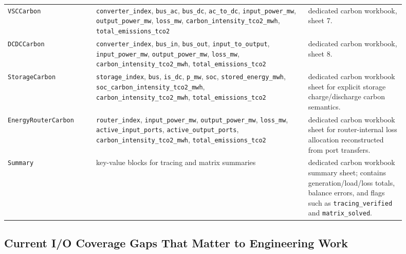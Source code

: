 \begin{longtable}{L{0.20\linewidth}L{0.48\linewidth}L{0.22\linewidth}}
\texttt{VSCCarbon} & \texttt{converter\_index}, \texttt{bus\_ac}, \texttt{bus\_dc}, \texttt{ac\_to\_dc}, \texttt{input\_power\_mw}, \texttt{output\_power\_mw}, \texttt{loss\_mw}, \texttt{carbon\_intensity\_tco2\_mwh}, \texttt{total\_emissions\_tco2} & dedicated carbon workbook, sheet 7. \\
\texttt{DCDCCarbon} & \texttt{converter\_index}, \texttt{bus\_in}, \texttt{bus\_out}, \texttt{input\_to\_output}, \texttt{input\_power\_mw}, \texttt{output\_power\_mw}, \texttt{loss\_mw}, \texttt{carbon\_intensity\_tco2\_mwh}, \texttt{total\_emissions\_tco2} & dedicated carbon workbook, sheet 8. \\
\texttt{StorageCarbon} & \texttt{storage\_index}, \texttt{bus}, \texttt{is\_dc}, \texttt{p\_mw}, \texttt{soc}, \texttt{stored\_energy\_mwh}, \texttt{soc\_carbon\_intensity\_tco2\_mwh}, \texttt{carbon\_intensity\_tco2\_mwh}, \texttt{total\_emissions\_tco2} & dedicated carbon workbook sheet for explicit storage charge/discharge carbon semantics. \\
\texttt{EnergyRouterCarbon} & \texttt{router\_index}, \texttt{input\_power\_mw}, \texttt{output\_power\_mw}, \texttt{loss\_mw}, \texttt{active\_input\_ports}, \texttt{active\_output\_ports}, \texttt{carbon\_intensity\_tco2\_mwh}, \texttt{total\_emissions\_tco2} & dedicated carbon workbook sheet for router-internal loss allocation reconstructed from port transfers. \\
\texttt{Summary} & key-value blocks for tracing and matrix summaries & dedicated carbon workbook summary sheet; contains generation/load/loss totals, balance errors, and flags such as \texttt{tracing\_verified} and \texttt{matrix\_solved}. \\
\bottomrule
\end{longtable}

\subsection{Current I/O Coverage Gaps That Matter to Engineering Work}

